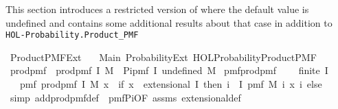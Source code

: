 %
\begin{isabellebody}%
%
%
\isadelimdocument
%
\endisadelimdocument
%
\isatagdocument
%
\isamarkuptrue%
%
\endisatagdocument
{\isafolddocument}%
%
\isadelimdocument
%
\endisadelimdocument
%
\begin{isamarkuptext}%
This section introduces a restricted version of  where the default value is undefined
and contains some additional results about that case in addition to \verb|HOL-Probability.Product_PMF|%
\end{isamarkuptext}\isamarkuptrue%
%
\isadelimtheory
%
\endisadelimtheory
%
\isatagtheory
{}\isamarkupfalse%
\ Product{\isacharunderscore}{\kern0pt}PMF{\isacharunderscore}{\kern0pt}Ext\isanewline
\ \ \ Main\ Probability{\isacharunderscore}{\kern0pt}Ext\ {\isachardoublequoteopen}HOL{\isacharminus}{\kern0pt}Probability{\isachardot}{\kern0pt}Product{\isacharunderscore}{\kern0pt}PMF{\isachardoublequoteclose}\isanewline
{}%
\endisatagtheory
{\isafoldtheory}%
%
\isadelimtheory
%
\endisadelimtheory
\isanewline
\isanewline
{}\isamarkupfalse%
\ prod{\isacharunderscore}{\kern0pt}pmf\ \ {\isachardoublequoteopen}prod{\isacharunderscore}{\kern0pt}pmf\ I\ M\ {\isacharequal}{\kern0pt}\ Pi{\isacharunderscore}{\kern0pt}pmf\ I\ undefined\ M{\isachardoublequoteclose}\isanewline
\isanewline
{}\isamarkupfalse%
\ pmf{\isacharunderscore}{\kern0pt}prod{\isacharunderscore}{\kern0pt}pmf{\isacharcolon}{\kern0pt}\ \isanewline
\ \ \ {\isachardoublequoteopen}finite\ I{\isachardoublequoteclose}\isanewline
\ \ \ {\isachardoublequoteopen}pmf\ {\isacharparenleft}{\kern0pt}prod{\isacharunderscore}{\kern0pt}pmf\ I\ M{\isacharparenright}{\kern0pt}\ x\ {\isacharequal}{\kern0pt}\ {\isacharparenleft}{\kern0pt}if\ x\ {\isasymin}\ extensional\ I\ then\ {\isasymProd}i\ {\isasymin}\ I{\isachardot}{\kern0pt}\ {\isacharparenleft}{\kern0pt}pmf\ {\isacharparenleft}{\kern0pt}M\ i{\isacharparenright}{\kern0pt}{\isacharparenright}{\kern0pt}\ {\isacharparenleft}{\kern0pt}x\ i{\isacharparenright}{\kern0pt}\ else\ {}{\isacharparenright}{\kern0pt}{\isachardoublequoteclose}\isanewline
%
\isadelimproof
\ \ %
\endisadelimproof
%
\isatagproof
{}\isamarkupfalse%
\ {\isacharparenleft}{\kern0pt}simp\ add{\isacharcolon}{\kern0pt}prod{\isacharunderscore}{\kern0pt}pmf{\isacharunderscore}{\kern0pt}def\ \ pmf{\isacharunderscore}{\kern0pt}Pi{\isacharbrackleft}{\kern0pt}OF\ assms{\isacharparenleft}{\kern0pt}{}{\isacharparenright}{\kern0pt}{\isacharbrackright}{\kern0pt}\ extensional{\isacharunderscore}{\kern0pt}def{\isacharparenright}{\kern0pt}%

\end{isabellebody}
